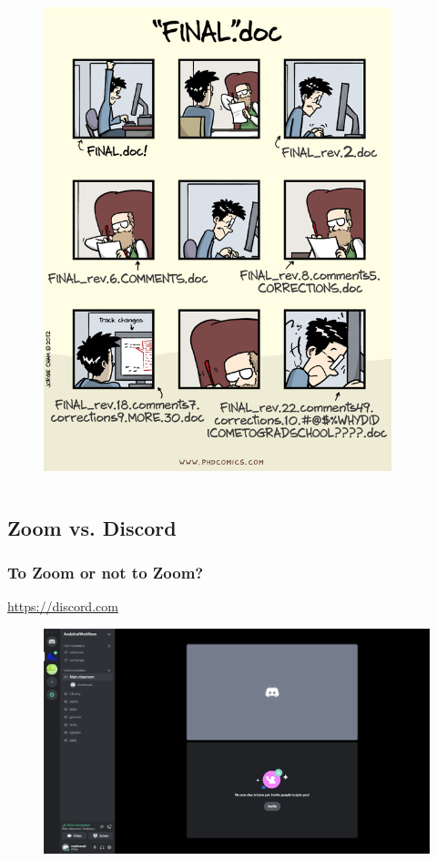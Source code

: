 \documentclass{beamer}
\begin{document}
\begin{frame}
\begin{columns}
   \begin{figure}
    \centering
    \includegraphics[width = 0.9\textwidth]{figs/phd101212s.png}
  \end{figure}
\end{columns}
\end{frame}

\subsection{Zoom vs. Discord}

\begin{frame}
    \frametitle{To Zoom or not to Zoom?}
   \url{https://discord.com}
    \begin{figure}
        \centering
        \includegraphics[width = 1\textwidth]{figs/Discord.png}
  \end{figure}

\end{frame}
\end{document}
